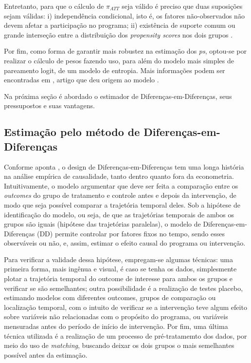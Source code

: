 Entretanto, para que o cálculo de $\pi_{ATT}$ seja válido é preciso que duas suposições sejam válidas: i) independência condicional, isto é, os fatores não-observados não devem afetar a participação no programa; ii) existência de suporte comum ou grande interseção entre a distribuição dos \textit{propensity scores} nos dois grupos \cite[p.~55]{Khandker2010}.

Por fim, como forma de garantir mais robustez na estimação dos \textit{ps}, optou-se por realizar o cálculo de pesos fazendo uso, para além do modelo mais simples de pareamento logit, de um modelo de entropia. Mais informações podem ser encontradas em , artigo que deu origem ao modelo .

Na próxima seção é abordado o estimador de Diferenças-em-Diferenças, seus pressupostos e suas vantagens.

\subsection{Estimação pelo método de Diferenças-em-Diferenças}

Conforme aponta , o design de Diferenças-em-Diferenças tem uma longa história na análise empírica de causalidade, tanto dentro quanto fora da econometria. Intuitivamente, o modelo argumentar que deve ser feita a comparação entre os \textit{outcomes} do grupo de tratamento e controle antes e depois da intervenção, de modo que seja possível comparar a trajetória temporal deles. Sob a hipótese de identificação do modelo, ou seja, de que as trajetórias temporais de ambos os grupos são iguais (hipótese das trajetórias paralelas), o modelo de Diferenças-em-Diferenças (DD) permite controlar por fatores fixos no tempo, sendo esses observáveis ou não, e, assim, estimar o efeito causal do programa ou intervenção.

Para verificar a validade dessa hipótese, empregam-se algumas técnicas: uma primeira forma, mais ingênua e visual, é caso se tenha os dados, simplesmente plotar a trajetória temporal do outcome de interesse para ambos os grupos e verificar se são semelhantes; outra possibilidade é a realização de testes placebo, estimando modelos com diferentes outcomes, grupos de comparação ou localização temporal, com o intuito de verificar se a intervenção teve algum efeito sobre variáveis não relacionadas com o propósito do programa, ou variáveis mensuradas antes do período de início de intervenção. Por fim, uma última técnica utilizada é a realização de um processo de pré-tratamemto dos dados, por meio do uso de \textit{matching}, buscando deixar os dois grupos o mais semelhantes possível antes da estimação.

